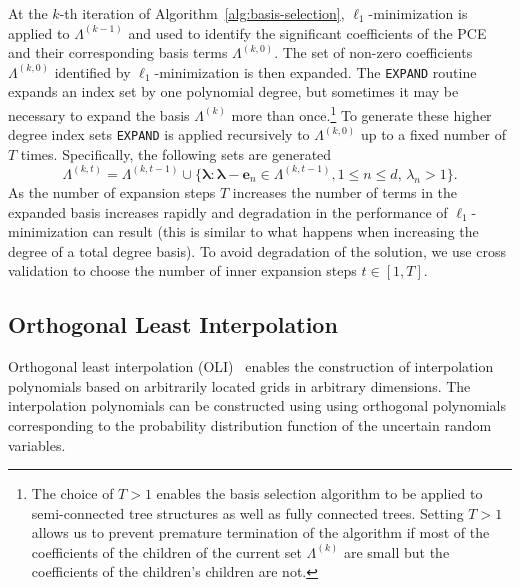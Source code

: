At the $k$-th iteration of Algorithm~\ref{alg:basis-selection}, $\ell_1$-minimization is applied to $\Lambda^{(k-1)}$ and used to identify the significant coefficients of the PCE and their corresponding basis terms $\Lambda^{(k,0)}$. 
The set of non-zero coefficients $\Lambda^{(k,0)}$ identified by $\ell_1$-minimization is then expanded. 
The \texttt{EXPAND} routine expands an index set by one polynomial degree,
but sometimes it may be necessary to expand the basis $\Lambda^{(k)}$ more than once.\footnote{The choice of $T>1$ enables the basis selection algorithm to be applied to semi-connected 
tree structures as well as fully connected trees. Setting $T>1$ allows us to prevent premature termination of
the algorithm if most of the coefficients of the children of the current set $\Lambda^{(k)}$ are small but the coefficients of the children's children are not.}
To generate these higher degree index sets \texttt{EXPAND} is applied recursively to $\Lambda^{(k,0)}$ up to a fixed number of $T$ times.
Specifically, the following sets are generated
$$\Lambda^{(k,t)}=\Lambda^{(k,t-1)}\cup\{\boldsymbol{\lambda}:\boldsymbol{\lambda}-\mathbf{e}_n\in\Lambda^{(k,t-1)},1\le n\le d,\, \lambda_n > 1\}.$$  
As the number of expansion steps $T$ increases the number of terms in the expanded basis increases rapidly and
degradation in the performance of $\ell_1$-minimization can result (this is similar to what happens when increasing the degree of a total degree basis). 
To avoid degradation of the solution, we use cross validation to choose the number of inner expansion steps $t\in[1,T]$.

\subsection{Orthogonal Least Interpolation}
Orthogonal least interpolation (OLI)~\cite{narayan12} enables the construction of  interpolation polynomials based on arbitrarily located grids in arbitrary dimensions. The interpolation polynomials can be constructed using using orthogonal polynomials corresponding to the probability distribution function of the uncertain random variables. 

